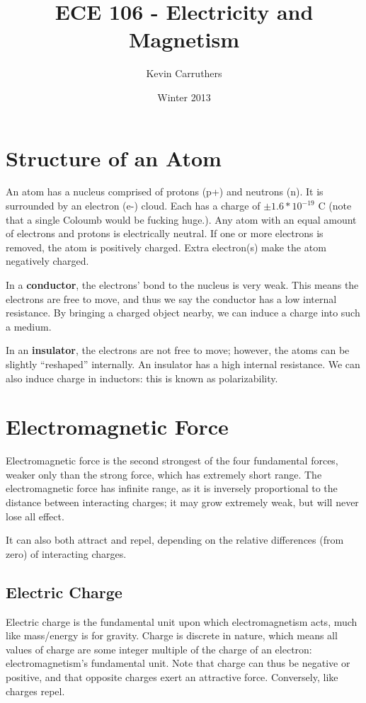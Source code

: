 \documentclass[12pt]{article}
\begin{document}
\title{ECE 106 - Electricity and Magnetism}
\author{Kevin Carruthers}
\date{\vspace{-2ex}Winter 2013}
\maketitle\HRule

\section*{Structure of an Atom}
An atom has a nucleus comprised of protons (p+) and neutrons (n). It is surrounded by an electron (e-) cloud. Each has a charge of $\pm 1.6*10^{-19}$ C (note that a single Coloumb would be fucking huge.). Any atom with an equal amount of electrons and protons is electrically neutral. If one or more electrons is removed, the atom is positively charged. Extra electron(s) make the atom negatively charged.

In a {\bf conductor}, the electrons' bond to the nucleus is very weak. This means the electrons are free to move, and thus we say the conductor has a low internal resistance. By bringing a charged object nearby, we can induce a charge into such a medium.

In an {\bf insulator}, the electrons are not free to move; however, the atoms can be slightly ``reshaped'' internally. An insulator has a high internal resistance. We can also induce charge in inductors: this is known as polarizability.

\section*{Electromagnetic Force}
Electromagnetic force is the second strongest of the four fundamental forces, weaker only than the strong force, which has extremely short range. The electromagnetic force has infinite range, as it is inversely proportional to the distance between interacting charges; it may grow extremely weak, but will never lose all effect.

It can also both attract and repel, depending on the relative differences (from zero) of interacting charges.

\subsection*{Electric Charge}
Electric charge is the fundamental unit upon which electromagnetism acts, much like mass/energy is for gravity. Charge is discrete in nature, which means all values of charge are some integer multiple of the charge of an electron: electromagnetism's fundamental unit. Note that charge can thus be negative or positive, and that opposite charges exert an attractive force. Conversely, like charges repel.
\end{document}

